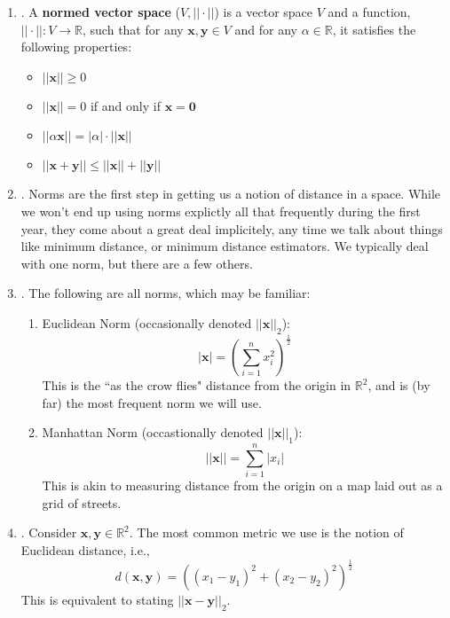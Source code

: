 \documentclass[12pt]{article}
\begin{document}
\begin{enumerate}
\begin{enumerate}
	\item\underline{}.
	A \textbf{normed vector space} ($V, || \cdot ||$) is a vector space $V$ and a function, $|| \cdot || : V \rightarrow\mathbb{R}$, such that for any $\mathbf{x}, \mathbf{y} \in V$ and for any $\alpha \in \mathbb{R}$, it satisfies the following properties:
	\begin{itemize}
		\item $||\mathbf{x}|| \geq 0$
		\item $||\mathbf{x}||=0$ if and only if $\mathbf{x}=\mathbf{0}$
		\item $||\alpha\mathbf{x}||=|\alpha|\cdot ||\mathbf{x}||$
		\item $||\mathbf{x}+\mathbf{y}||\leq ||\mathbf{x}||+||\mathbf{y}||$\\
	\end{itemize}

		\item\underline{}. Norms are the first step in getting us a notion of distance in a space. While we won't end up using
	norms explictly all that frequently during the first year, they come about a great deal implicitely, any time we talk about
	things like minimum distance, or minimum distance estimators. We typically deal with one norm, but there are a few others.
	
	\item\underline{}.
	The following are all norms, which may be familiar:
	\begin{enumerate}
		\item Euclidean Norm (occasionally denoted $||\mathbf{x}||_2$):
		\[|\mathbf{x}|=\left(\sum_{i=1}^n x_i^2\right)^\frac{1}{2}\]
		This is the ``as the crow flies" distance from the origin in $\mathbb{R}^2$, and is (by far) the most frequent norm we will use.
		
		\item Manhattan Norm (occastionally denoted $||\mathbf{x}||_1$):
		\[||\mathbf{x}||=\sum_{i=1}^n|x_i|\]
		This is akin to measuring distance from the origin on a map laid out as a grid of streets.
	\end{enumerate}

	\item\underline{}.
		Consider $\mathbf{x},\mathbf{y}\in\mathbb{R}^2$. The most common metric we use is the notion of Euclidean distance, i.e.,
			\[d(\mathbf{x},\mathbf{y})=\left((x_1-y_1)^2+(x_2-y_2)^2\right)^{\frac{1}{2}}\]
		This is equivalent to stating $||\mathbf{x}-\mathbf{y}||_2$.
		

\end{enumerate}
\end{enumerate}
\end{document}
